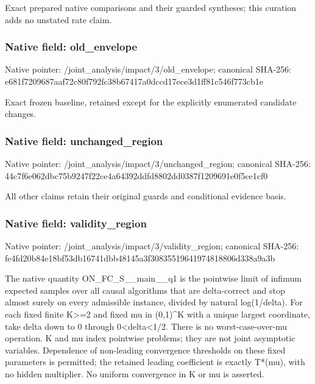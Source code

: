 \documentclass[10pt,a4paper]{article}
\begin{document}
\begingroup\raggedright\sloppy Exact prepared native comparisons and their guarded syntheses;\allowbreak{} this curation adds no unstated rate claim.\par\endgroup

\subsubsection{Native field: old\_\allowbreak{}envelope}
Native pointer: /joint\_\allowbreak{}analysis/impact/3/old\_\allowbreak{}envelope; canonical SHA-256: e681f7209687aaf72c80f792fc38b67417a0dccd17ece3d1ff81c546f773cb1e

\begingroup\raggedright\sloppy Exact frozen baseline,\allowbreak{} retained except for the explicitly enumerated candidate changes.\par\endgroup

\subsubsection{Native field: unchanged\_\allowbreak{}region}
Native pointer: /joint\_\allowbreak{}analysis/impact/3/unchanged\_\allowbreak{}region; canonical SHA-256: 44c7f6e062dbc75b9247f22ce4a64392ddfd8802dd0387f1209691e0f5ce1cf0

\begingroup\raggedright\sloppy All other claims retain their original guards and conditional evidence basis.\par\endgroup

\subsubsection{Native field: validity\_\allowbreak{}region}
Native pointer: /joint\_\allowbreak{}analysis/impact/3/validity\_\allowbreak{}region; canonical SHA-256: fe4fd20b84e18bf53db16741dbb48145a3f30835519641974818806d338a9a3b

\begingroup\raggedright\sloppy The native quantity ON\_\allowbreak{}FC\_\allowbreak{}S\_\allowbreak{}\_\allowbreak{}main\_\allowbreak{}\_\allowbreak{}q1 is the pointwise limit of infimum expected samples over all causal algorithms that are delta-correct and stop almost surely on every admissible instance,\allowbreak{} divided by natural log(1/\allowbreak{}delta). For each fixed finite K>=\allowbreak{}2 and fixed mu in (0,\allowbreak{}1)\textasciicircum{}K with a unique largest coordinate,\allowbreak{} take delta down to 0 through 0<delta<1/\allowbreak{}2. There is no worst-case-over-mu operation. K and mu index pointwise problems;\allowbreak{} they are not joint asymptotic variables. Dependence of non-leading convergence thresholds on these fixed parameters is permitted;\allowbreak{} the retained leading coefficient is exactly T*(mu),\allowbreak{} with no hidden multiplier. No uniform convergence in K or mu is asserted.\par\endgroup
\end{document}

